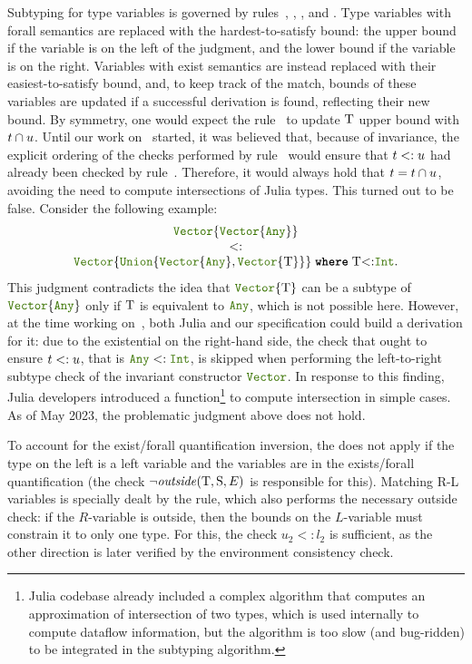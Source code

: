 Subtyping for type variables is governed by
rules~, ,
, and .  Type variables
with forall semantics are replaced with the hardest-to-satisfy bound:
the upper bound if the variable is on the left of the judgment, and
the lower bound if the variable is on the right.  Variables with exist
semantics are instead replaced with their easiest-to-satisfy bound,
and, to keep track of the match, bounds of these variables are updated
if a successful derivation is found, reflecting their new bound.  By
symmetry, one would expect the rule~ to update
\(\mathrm{T}\) upper bound with \(t \cap u\). 
Until our work on~\cite{bib:zappa-nardelli:julia-sub:oopsla:2018} started, it
was believed that, because of invariance, the explicit ordering of the
checks performed by rule~ would ensure that \(t <: u\) had
already been checked by rule~.  Therefore, it
would always hold that \(t = t \cap u\), avoiding the need
to compute intersections of Julia types. This
turned out to be false.  Consider the following example:
\[
  \begin{array}{c}
    \vectyp{\vectyp{\anytyp}} \\
    <: \\
    \wheret{\vectyp{\uniontyp{\vectyp{\anytyp}, \vectyp{\T}}}}{\T{<:}\inttyp}.  
  \end{array}
\]\label{juliabug:rleft}
\noindent This judgment contradicts the idea that \(\vectyp{\T}\)
can be a subtype of \(\vectyp{\anytyp}\) only if \(\mathrm{T}\) is
equivalent to \(\anytyp\), which is not possible here.  However,
at the time working on~\cite{bib:zappa-nardelli:julia-sub:oopsla:2018},
both Julia and our specification could build a derivation for it: due to
the existential on the right-hand side, the check that ought to ensure
\(t <: u\), that is \(\anytyp <: \inttyp\), is skipped when
performing the left-to-right subtype check of the invariant
constructor \(\jlname{Vector}\). 
In response to this finding, Julia developers introduced a
 function\footnote{Julia codebase already included a complex
algorithm that computes an approximation of intersection of two types, which
is used internally to compute dataflow information, but the algorithm is too
slow (and bug-ridden) to be integrated in the subtyping algorithm.}
to compute intersection in simple cases.
As of May 2023, the problematic judgment above does not hold.

To account for the exist/forall
quantification inversion, the  does not apply
if the type on the left is
a left variable and the variables are in the exists/forall quantification
(the check \(\lnot\mathit{outside}(\mathrm{T},\mathrm{S},E)\) is responsible for this).
Matching R-L
variables is specially dealt by the  rule, which
also performs the necessary outside check: if the \(R\)-variable is
outside, then the bounds on the \(L\)-variable must constrain it to
only one type.  For this, the check \(u_2 <: l_2\) is sufficient, as the
other direction is later verified by the environment consistency check.

